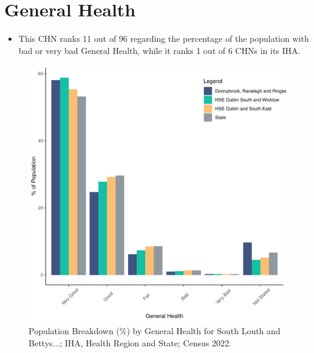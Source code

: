\documentclass{article}
\begin{document}
\pagebreak

\section{General Health}\label{sect:GenHealth}
\begin{itemize}
\item  This CHN ranks  11 out of 96 regarding the percentage of the population with bad or very bad General Health, while it ranks   1 out of 6 CHNs in its IHA.
\end{itemize}
\begin{figure}[h]
	\centering
	\includegraphics[width = 150mm]{../figures/GenED.pdf}
	\caption{Population Breakdown (\%) by General Health for South Louth and Bettys...; IHA, Health Region and State;  Census 2022.}
	\label{fig:2ae19629-1a6a-13a3-e055-000000000001}
	\end{figure}
\end{document}
